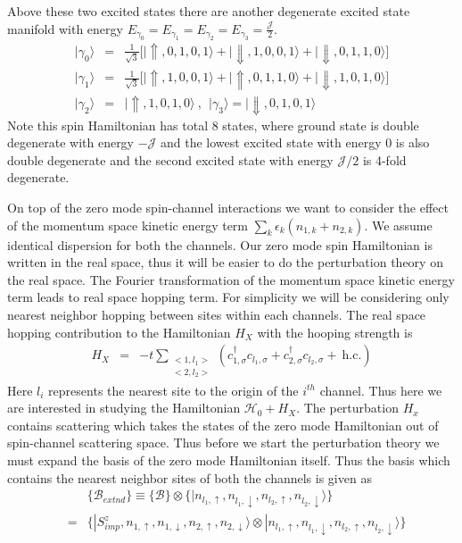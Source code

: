 \documentclass[reprint,prb,superscriptaddress]{revtex4-2}
\begin{document}
Above these two excited states there are another degenerate excited state manifold with energy $ E_{\gamma_0}=E_{\gamma_1}=E_{\gamma_2}=E_{\gamma_3}=\frac{{\mathcal{J}}}{2}$.
\begin{eqnarray}
|\gamma_{0}\rangle &=&\frac{1}{\sqrt{3}} \bigg[|\Uparrow,0,1,0,1\rangle+|\Downarrow,1,0,0,1\rangle+|\Downarrow,0,1,1,0\rangle \bigg] \nonumber\\
|\gamma_{1}\rangle &=& \frac{1}{\sqrt{3}}\bigg[ |\Uparrow,1,0,0,1\rangle+|\Uparrow,0,1,1,0\rangle+|\Downarrow,1,0,1,0\rangle \bigg] \nonumber\\
|\gamma_{2}\rangle &=& |\Uparrow,1,0,1,0\rangle~,~~|\gamma_{3}\rangle = |\Downarrow,0,1,0,1\rangle 
\end{eqnarray}
Note this spin Hamiltonian has total $8$ states, where ground state is double degenerate with energy $-{\mathcal{J}}$ and the lowest excited state with energy $0$ is also double degenerate and the second excited state with energy ${\mathcal{J}}/2$ is 4-fold degenerate. 
\par On top of the zero mode spin-channel interactions we want to consider the effect of the momentum space kinetic energy term $\sum_{k}\epsilon_k (n_{1,k}+n_{2,k})$. We assume identical dispersion for both the channels. Our zero mode spin Hamiltonian is written in the real space, thus it will be easier to do the perturbation theory on the real space. The Fourier transformation of the momentum space kinetic energy  term leads to real space hopping term. For simplicity we will be considering only nearest neighbor hopping between sites within each channels. The real space hopping contribution to the Hamiltonian $H_X$ with the hooping strength is 
\begin{eqnarray}
H_{X} &=& -t \displaystyle\sum_{\substack{<1,l_1> \\ <2,l_2>}} (c^{\dagger}_{1,\sigma}c_{l_1,\sigma}+c^{\dagger}_{2,\sigma}c_{l_2,\sigma}+ ~\textrm{h.c.})
\end{eqnarray}
Here $l_i$ represents the nearest site to the origin of the $i^{th}$ channel. Thus here we are interested in studying the Hamiltonian $\mathcal{H}_0+H_X$. The perturbation $H_x$ contains scattering which takes the states of the zero mode Hamiltonian out of spin-channel scattering space. Thus before we start the perturbation theory we must expand the basis of the zero mode Hamiltonian itself. Thus the basis which contains the nearest neighbor sites of both the channels is given as 
\begin{eqnarray}
&&\{\mathcal{B}_{extnd}\} \equiv  \{\mathcal{B}\} \otimes  \{|n_{l_1,\uparrow},n_{l_1,\downarrow},n_{l_2,\uparrow},n_{l_2,\downarrow}\rangle\} \\
&=& \{|S^z_{imp},n_{1,\uparrow},n_{1,\downarrow},n_{2,\uparrow},n_{2,\downarrow}\rangle \otimes |n_{l_1,\uparrow},n_{l_1,\downarrow},n_{l_2,\uparrow},n_{l_2,\downarrow}\rangle\} \nonumber
\end{eqnarray}
\end{document}
